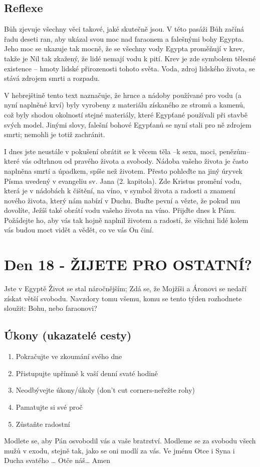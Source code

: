 \documentclass[11pt]{article}
\newcommand{\zacatekTretiTyden}{
  Jste v Egyptě \newline
  Život se stal náročnějším; Zdá se, že Mojžíši a Áronovi se nedaří získat větší svobodu. Navzdory tomu všemu,
komu se tento týden rozhodnete sloužit: Bohu, nebo faraonovi?

\subsection*{Úkony (ukazatelé cesty)}
\begin{enumerate}
  \item Pokračujte ve zkoumání svého dne
  \item Přistupujte upřímně k vaší denní svaté hodině
  \item Neodbývejte úkony/úkoly (don’t cut corners-neřežte rohy)
  \item Pamatujte si své proč
  \item Zůstaňte radostní
\end{enumerate}
Modlete se, aby Pán osvobodil vás a vaše bratrství. \newline
Modleme se za svobodu všech mužů v exodu, stejně tak, jako se oni modlí za vás.\newline
Ve jménu Otce i Syna i Ducha svatého …  Otče náš… Amen
}
\begin{document}
\subsection*{Reflexe}

Bůh zjevuje všechny věci takové, jaké skutečně jsou. V této pasáži Bůh začíná řadu deseti ran, aby ukázal svou
moc nad faraonem a falešnými bohy Egypta. Jeho moc se ukazuje tak mocně, že se všechny vody Egypta
proměňují v krev, takže je Nil tak zkažený, že lidé nemají vodu k pití. Krev je zde symbolem tělesné existence –
hmoty lidské přirozenosti tohoto světa. Voda, zdroj lidského života, se stává zdrojem smrti a rozpadu.

V hebrejštině tento text naznačuje, že hrnce a nádoby používané pro vodu (a nyní naplněné krví) byly vyrobeny z
materiálu získaného ze stromů a kamenů, což byly shodou okolností stejné materiály, které Egypťané používali při
stavbě svých model. Jinými slovy, falešní bohové Egypťanů se nyní stali pro ně zdrojem smrti; nemohli je totiž
zachránit.

I dnes jste neustále v pokušení obrátit se k věcem těla –k sexu, moci, penězům– které vás odtrhnou od pravého
života a svobody. Nádoba vašeho života je často naplněna smrtí a úpadkem, spíše než životem. Přesto pohleďte na
jiný úryvek Písma uvedený v evangeliu sv. Jana (2. kapitola). Zde Kristus promění vodu, která je v nádobách k
čištění, na víno, v symbol života a radosti a znamení nového života, který nám nabízí v Duchu. Buďte pevní a
vězte, že pokud mu dovolíte, Ježíš také obrátí vodu vašeho života na víno. Přijďte dnes k Pánu. Požádejte ho, aby
vás tak hojně naplnil životem a radostí, že všichni lidé kolem vás budou moct vidět a vědět, co ve vás On činí.

\newpage
\section{Den 18 - ŽIJETE PRO OSTATNÍ? }
\zacatekTretiTyden
\end{document}
